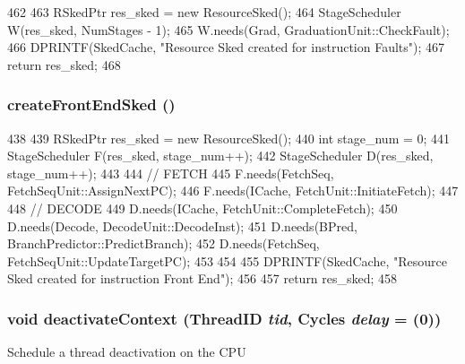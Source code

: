 \begin{DoxyCode}
462 {
463     RSkedPtr res_sked = new ResourceSked();
464     StageScheduler W(res_sked, NumStages - 1);
465     W.needs(Grad, GraduationUnit::CheckFault);
466     DPRINTF(SkedCache, "Resource Sked created for instruction Faults\n");
467     return res_sked;
468 }
\end{DoxyCode}
\hypertarget{classInOrderCPU_a58dbbb906338dea36ff442d23c1e576d}{
\subsubsection[{createFrontEndSked}]{ createFrontEndSked ()}}
\label{classInOrderCPU_a58dbbb906338dea36ff442d23c1e576d}



\begin{DoxyCode}
438 {
439     RSkedPtr res_sked = new ResourceSked();
440     int stage_num = 0;
441     StageScheduler F(res_sked, stage_num++);
442     StageScheduler D(res_sked, stage_num++);
443 
444     // FETCH
445     F.needs(FetchSeq, FetchSeqUnit::AssignNextPC);
446     F.needs(ICache, FetchUnit::InitiateFetch);
447 
448     // DECODE
449     D.needs(ICache, FetchUnit::CompleteFetch);
450     D.needs(Decode, DecodeUnit::DecodeInst);
451     D.needs(BPred, BranchPredictor::PredictBranch);
452     D.needs(FetchSeq, FetchSeqUnit::UpdateTargetPC);
453 
454 
455     DPRINTF(SkedCache, "Resource Sked created for instruction Front End\n");
456 
457     return res_sked;
458 }
\end{DoxyCode}
\hypertarget{classInOrderCPU_adec8c3e8de71e0e066f2104e29ced591}{
\subsubsection[{deactivateContext}]{\setlength{\rightskip}{0pt plus 5cm}void deactivateContext ({\bf ThreadID} {\em tid}, \/  {\bf Cycles} {\em delay} = {(0)})}}
\label{classInOrderCPU_adec8c3e8de71e0e066f2104e29ced591}
Schedule a thread deactivation on the CPU 


